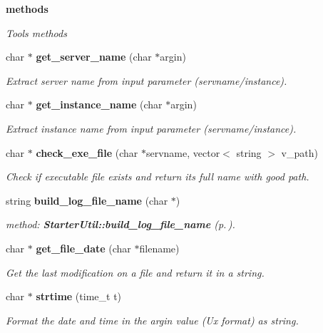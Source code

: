 \begin{Indent}{\bf methods}\par
{\em Tools methods}\begin{CompactItemize}
\item 
char $\ast$ {\bf get\_\-server\_\-name} (char $\ast$argin)
\begin{CompactList}\small\item\em Extract server name from input parameter (servname/instance).\item\end{CompactList}\item 
char $\ast$ {\bf get\_\-instance\_\-name} (char $\ast$argin)
\begin{CompactList}\small\item\em Extract instance name from input parameter (servname/instance).\item\end{CompactList}\item 
char $\ast$ {\bf check\_\-exe\_\-file} (char $\ast$servname, vector$<$ string $>$ v\_\-path)
\begin{CompactList}\small\item\em Check if executable file exists and return its full name with good path.\item\end{CompactList}\item 
string {\bf build\_\-log\_\-file\_\-name} (char $\ast$)
\begin{CompactList}\small\item\em method: {\bf Starter\-Util::build\_\-log\_\-file\_\-name} {\rm (p.\,\pageref{classStarter_1_1StarterUtil_z8_3})}.\item\end{CompactList}\item 
char $\ast$ {\bf get\_\-file\_\-date} (char $\ast$filename)
\begin{CompactList}\small\item\em Get the last modification on a file and return it in a string.\item\end{CompactList}\item 
char $\ast$ {\bf strtime} (time\_\-t t)
\begin{CompactList}\small\item\em Format the date and time in the argin value (Ux format) as string.\item\end{CompactList}\item 

\end{CompactItemize}
\end{Indent}
